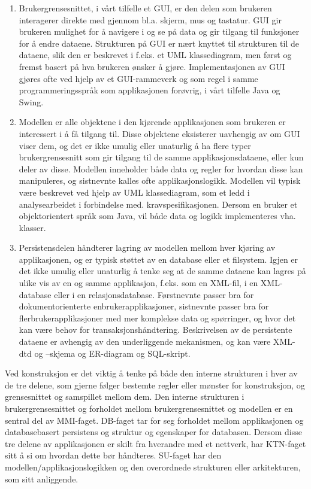 \begin{enumerate}

\item
Brukergrensesnittet, i vårt tilfelle et GUI, er den delen som brukeren interagerer direkte med gjennom bl.a. skjerm, mus og tastatur. GUI gir brukeren mulighet for å navigere i og se på data og gir tilgang til funksjoner for å endre dataene. Strukturen på GUI er nært knyttet til strukturen til de dataene, slik den er beskrevet i f.eks. et UML klassediagram, men først og fremst basert på hva brukeren ønsker å gjøre. Implementasjonen av GUI gjøres ofte ved hjelp av et GUI-rammeverk og som regel i samme programmeringsspråk som applikasjonen forøvrig, i vårt tilfelle Java og Swing.

\item
Modellen er alle objektene i den kjørende applikasjonen som brukeren er interessert i å få tilgang til. Disse objektene eksisterer uavhengig av om GUI viser dem, og det er ikke umulig eller unaturlig å ha flere typer brukergrensesnitt som gir tilgang til de samme applikasjonsdataene, eller kun deler av disse. Modellen inneholder både data og regler for hvordan disse kan manipuleres, og sistnevnte kalles ofte applikasjonslogikk. Modellen vil typisk være beskrevet ved hjelp av UML klassediagram, som et ledd i analysearbeidet i forbindelse med. kravspesifikasjonen. Dersom en bruker et objektorientert språk som Java, vil både data og logikk implementeres vha. klasser. 

\item
Persistensdelen håndterer lagring av modellen mellom hver kjøring av applikasjonen, og er typisk støttet av en database eller et filsystem. Igjen er det ikke umulig eller unaturlig å tenke seg at de samme dataene kan lagres på ulike vis av en og samme applikasjon, f.eks. som en XML-fil, i en XML-database eller i en relasjonsdatabase. Førstnevnte passer bra for dokumentorienterte enbrukerapplikasjoner, sistnevnte passer bra for flerbrukerapplikasjoner med mer komplekse data og spørringer, og hvor det kan være behov for transaksjonshåndtering. Beskrivelsen av de persistente dataene er avhengig av den underliggende mekanismen, og kan være XML-dtd og –skjema og ER-diagram og SQL-skript.

\end{enumerate}

Ved konstruksjon er det viktig å tenke på både den interne strukturen i hver av de tre delene, som gjerne følger bestemte regler eller mønster for konstruksjon, og grensesnittet og samspillet mellom dem. Den interne strukturen i brukergrensesnittet og forholdet mellom brukergrensesnittet og modellen er en sentral del av MMI-faget. DB-faget tar for seg forholdet mellom applikasjonen og databasebasert persistens og struktur og egenskaper for databasen. Dersom disse tre delene av applikasjonen er skilt fra hverandre med et nettverk, har KTN-faget sitt å si om hvordan dette bør håndteres. SU-faget har den modellen/applikasjonslogikken og den overordnede strukturen eller arkitekturen, som sitt anliggende.

